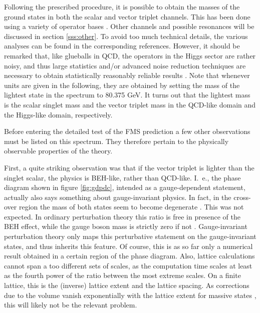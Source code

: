 \documentclass[final,12pt,3p,longtitle]{elsarticle}
\newcommand*{\1}{1\!\!\!\bot}
\begin{document}
Following the prescribed procedure, it is possible to obtain the masses of the ground states in both the scalar and vector triplet channels. This has been done using a variety of operator bases \cite{Wurtz:2013ova,Maas:2013aia,Maas:2014pba,Maas:2012tj,Langguth:1985eu,Langguth:1985dr,Evertz:1986vp,Evertz:1985fc}. Other channels and possible resonances will be discussed in section \ref{sss:other}. To avoid too much technical details, the various analyses can be found in the corresponding references. However, it should be remarked that, like glueballs in QCD, the operators in the Higgs sector are rather noisy, and thus large statistics and/or advanced noise reduction techniques are necessary to obtain statistically reasonably reliable results \cite{Philipsen:1996af,Wurtz:2013ova,Maas:2014pba}. Note that whenever units are given in the following, they are obtained by setting the mass of the lightest state in the spectrum to 80.375 GeV. It turns out that the lightest mass is the scalar singlet mass and the vector triplet mass in the QCD-like domain and the Higgs-like domain, respectively.

Before entering the detailed test of the FMS prediction a few other observations must be listed on this spectrum. They therefore pertain to the physically observable properties of the theory.

First, a quite striking observation \cite{Langguth:1985eu,Langguth:1985dr,Evertz:1986vp,Evertz:1985fc,Maas:2014pba} was that if the vector triplet is lighter than the singlet scalar, the physics is BEH-like, rather than QCD-like. I.\ e., the phase diagram shown in figure \ref{fig:gdpdc}, intended as a gauge-dependent statement, actually also says something about gauge-invariant physics. In fact, in the cross-over region the mass of both states seem to become degenerate \cite{Maas:2014pba}. This was not expected. In ordinary perturbation theory this ratio is free in presence of the BEH effect, while the gauge boson mass is strictly zero if not \cite{Bohm:2001yx}. Gauge-invariant perturbation theory only maps this perturbative statement on the gauge-invariant states, and thus inherits this feature. Of course, this is as so far only a numerical result obtained in a certain region of the phase diagram. Also, lattice calculations cannot span a too different sets of scales, as the computation time scales at least as the fourth power of the ratio between the most extreme scales. On a finite lattice, this is the (inverse) lattice extent and the lattice spacing. As corrections due to the volume vanish exponentially with the lattice extent for massive states \cite{Luscher:1985dn}, this will likely not be the relevant problem.
\end{document}
